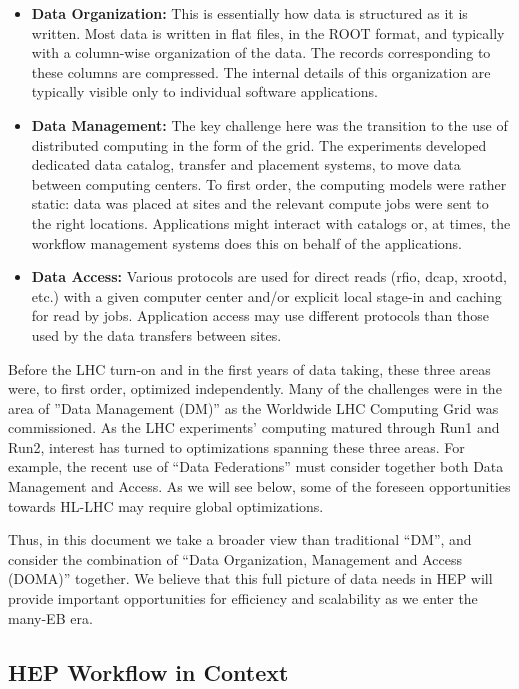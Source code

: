 \documentclass[12pt,a4paper]{article}
\begin{document}
\begin{itemize}
\item \textbf{Data Organization:} This is essentially how data is structured
  as it is written. Most data is written in flat files, in the ROOT format, and
  typically with a column-wise organization of the data. The records
  corresponding to these columns are compressed. The internal details of
  this organization are typically visible only to individual software
  applications.
\item \textbf{Data Management:} The key challenge here was the transition to
  the use of distributed computing in the form of the grid. The
  experiments developed dedicated data catalog,  transfer and placement systems,
  to move data between computing centers. To first
  order, the computing models were rather static: data was placed at
  sites and the relevant compute jobs were sent to the right locations.
  Applications might interact with catalogs or, at times, the workflow
  management systems does this on behalf of the applications.
\item \textbf{Data Access:} Various protocols are used for direct reads
  (rfio, dcap, xrootd, etc.) with a given computer center and/or
  explicit local stage-in and caching for read by jobs. Application
  access may use different protocols than those used by the data
  transfers between sites.
\end{itemize}

Before the LHC turn-on and in the first years of data taking, these three
areas were, to first order, optimized independently. Many of the
challenges were in the area of ''Data Management (DM)'' as the Worldwide
LHC Computing Grid was commissioned. As the LHC experiments' computing matured
through Run1 and Run2, interest has turned to optimizations spanning
these three areas. For example, the recent use of ``Data Federations''
must consider together both Data Management and Access. As we will see below, some of the
foreseen opportunities towards HL-LHC may require global optimizations.

Thus, in this document we take a broader view than traditional ``DM'',
and consider the combination of ``Data Organization, Management and
Access (DOMA)'' together. We believe that this full picture of data
needs in HEP will provide important opportunities for efficiency and
scalability as we enter the many-EB era.

\subsection{HEP Workflow in Context}\label{hep-workflow-in-context}
\end{document}

